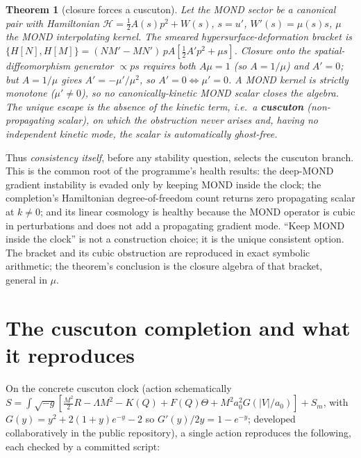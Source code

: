 \documentclass[11pt,letterpaper]{article}
\newtheorem{theorem}{Theorem}
\begin{document}
\begin{theorem}[closure forces a cuscuton]
Let the MOND sector be a canonical pair with Hamiltonian $\mathcal H=\tfrac12 A(s)p^2+W(s)$, $s=u'$,
$W'(s)=\mu(s)s$, $\mu$ the MOND interpolating kernel. The smeared hypersurface-deformation bracket is
$\{H[N],H[M]\}=(NM'-MN')\,pA[\tfrac12A'p^2+\mu s]$. Closure onto the spatial-diffeomorphism generator
$\propto ps$ requires both $A\mu=1$ (so $A=1/\mu$) and $A'=0$; but $A=1/\mu$ gives $A'=-\mu'/\mu^2$, so
$A'=0\Leftrightarrow\mu'=0$. A MOND kernel is strictly monotone ($\mu'\neq0$), so no canonically-kinetic MOND
scalar closes the algebra. The unique escape is the absence of the kinetic term, i.e.\ a \textbf{cuscuton}
(non-propagating scalar), on which the obstruction never arises and, having no independent kinetic mode, the
scalar is automatically ghost-free.
\end{theorem}

Thus \emph{consistency itself}, before any stability question, selects the cuscuton branch. This is the
common root of the programme's health results: the deep-MOND gradient instability is evaded only by keeping
MOND inside the clock; the completion's Hamiltonian degree-of-freedom count returns zero propagating scalar
at $k\neq0$; and its linear cosmology is healthy because the MOND operator is cubic in perturbations and does
not add a propagating gradient mode. ``Keep MOND inside the clock'' is not a construction choice; it is the
unique consistent option. The bracket and its cubic obstruction are reproduced in exact symbolic arithmetic;
the theorem's conclusion is the closure algebra of that bracket, general in $\mu$.

\section{The cuscuton completion and what it reproduces}
On the concrete cuscuton clock (action schematically
$S=\int\sqrt{-g}[\tfrac{M^2}2R-\Lambda M^2-K(Q)+F(Q)\Theta+M^2a_0^2G(|V|/a_0)]+S_m$, with
$G(y)=y^2+2(1+y)e^{-y}-2$ so $G'(y)/2y=1-e^{-y}$; developed collaboratively in the public repository), a
single action reproduces the following, each checked by a committed script:
\end{document}
